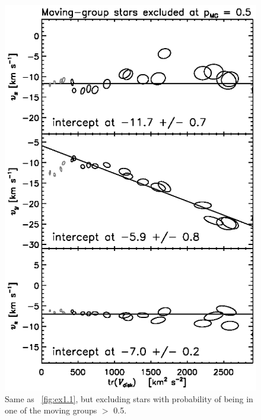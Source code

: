 \documentclass[12pt,preprint]{aastex}
\begin{document}
\clearpage
\begin{figure}
\includegraphics[]{lsr_dropblue_groupcut0.5.ps}
\caption{Same as \figurename~\ref{fig:ex1.1}, but excluding stars with
 probability of being in one of the moving groups $>$ 0.5.}\label{fig:ex0.5}
\end{figure}
\end{document}
